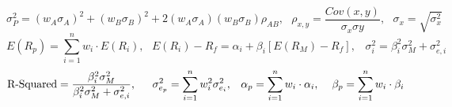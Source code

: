 $$\sigma^{2}_{P} = (w_{A}\sigma_{A})^{2} + (w_{B}\sigma_{B})^{2} + 2(w_{A}\sigma_{A})(w_{B}\sigma_{B})\rho_{AB}, \,\,\,\, \rho_{x,y} = \frac{Cov(x,y)}{\sigma_{x}\sigma{y}}, \,\,\,\, \sigma_{x} = \sqrt{\sigma_{x}^{2}}$$
$$ E(R_{p}) = \sum_{i=1}^{n}w_{i}\cdot E(R_{i}), \,\,\,\,  E(R_{i}) - R_{f} =\alpha_{i} + \beta_{i}[E(R_{M})-R_{f}], \,\,\,\,\, \sigma^{2}_{i} = \beta^{2}_{i}\sigma^{2}_{M}+ \sigma^{2}_{e,i}$$
$$\textmd{R-Squared} = \frac{\beta^{2}_{i}\sigma^{2}_{M}}{\beta^{2}_{i}\sigma^{2}_{M}+ \sigma^{2}_{e,i}}, \,\,\,\,\,\,\,\,\, \sigma^{2}_{e_{p}} = \sum_{i=1}^{n}w^{2}_{i}\sigma^{2}_{e_{i}}, \,\,\,\,\, \alpha_{p} = \sum_{i=1}^{n} w_{i}\cdot \alpha_{i}, \,\,\,\,\,\,\, \beta_{p} = \sum_{i=1}^{n}w_{i}\cdot \beta_{i}$$